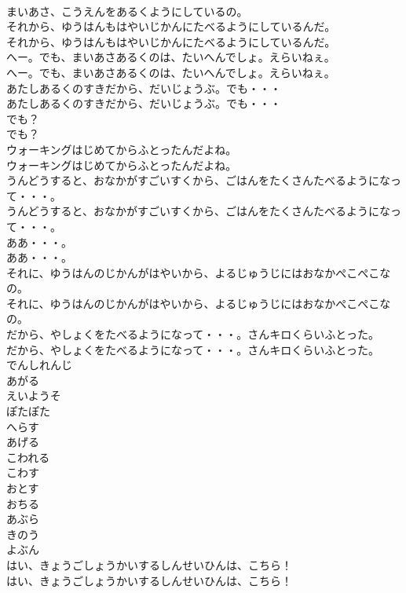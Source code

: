 \documentclass[8pt]{extreport}
\begin{document}
\begin{CJK}{UTF8}{min}
\\	まいあさ、こうえんをあるくようにしているの。
\\	それから、ゆうはんもはやいじかんにたべるようにしているんだ。
\\	それから、ゆうはんもはやいじかんにたべるようにしているんだ。
\\	へー。でも、まいあさあるくのは、たいへんでしょ。えらいねぇ。
\\	へー。でも、まいあさあるくのは、たいへんでしょ。えらいねぇ。
\\	あたしあるくのすきだから、だいじょうぶ。でも・・・
\\	あたしあるくのすきだから、だいじょうぶ。でも・・・
\\	でも？
\\	でも？
\\	ウォーキングはじめてからふとったんだよね。
\\	ウォーキングはじめてからふとったんだよね。
\\	うんどうすると、おなかがすごいすくから、ごはんをたくさんたべるようになって・・・。
\\	うんどうすると、おなかがすごいすくから、ごはんをたくさんたべるようになって・・・。
\\	ああ・・・。
\\	ああ・・・。
\\	それに、ゆうはんのじかんがはやいから、よるじゅうじにはおなかぺこぺこなの。
\\	それに、ゆうはんのじかんがはやいから、よるじゅうじにはおなかぺこぺこなの。
\\	だから、やしょくをたべるようになって・・・。さんキロくらいふとった。
\\	だから、やしょくをたべるようになって・・・。さんキロくらいふとった。
\\	でんしれんじ
\\	あがる
\\	えいようそ
\\	ぽたぽた
\\	へらす
\\	あげる
\\	こわれる
\\	こわす
\\	おとす
\\	おちる
\\	あぶら
\\	きのう
\\	よぶん
\\	はい、きょうごしょうかいするしんせいひんは、こちら！
\\	はい、きょうごしょうかいするしんせいひんは、こちら！

\end{CJK}
\end{document}
